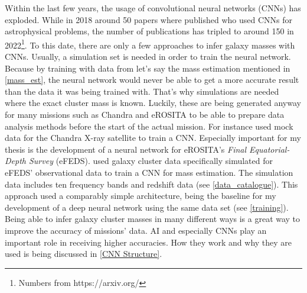 Within the last few years, the usage of convolutional neural networks (CNNs) has exploded. While in 2018 around 50 papers where published who used CNNs for astrophysical problems, the number of publications has tripled to around 150 in 2022\footnote{Numbers from https://arxiv.org/}. To this date, there are only a few approaches to infer galaxy masses with CNNs. Usually, a simulation set is needed in order to train the neural network. Because by training with data from let's say the mass estimation mentioned in \cref{mass_est}, the neural network would never be able to get a more accurate result than the data it was being trained with. That's why simulations are needed where the exact cluster mass is known. Luckily, these are being generated anyway for many missions such as Chandra and eROSITA to be able to prepare data analysis methods before the start of the actual mission. For instance \citet{Ntampaka_2018} used mock data for the Chandra X-ray satellite to train a CNN. Especially important for my thesis is the development of a neural network for eROSITA's \textit{Final Equatorial-Depth Survey} (eFEDS). \citet{Krippendorf_2023} used galaxy cluster data specifically simulated for eFEDS' observational data to train a CNN for mass estimation. The simulation data includes ten frequency bands and redshift data (see \cref{data_catalogue}). This approach used a comparably simple architecture, being the baseline for my development of a deep neural network using the same data set (see \cref{training}). Being able to infer galaxy cluster masses in many different ways is a great way to improve the accuracy of missions' data. AI and especially CNNs play an important role in receiving higher accuracies. How they work and why they are used is being discussed in \cref{CNN Structure}.